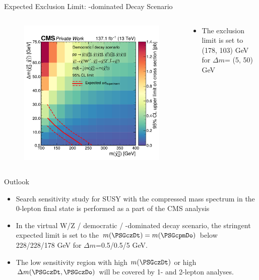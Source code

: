 \begin{frame}[fragile]{Expected Exclusion Limit: \PSGt-dominated Decay Scenario}
  \begin{columns}
    \begin{column}{0.5\textwidth}
      \begin{figure}[htpb]
        \centering
        \includegraphics[width=1.0\textwidth]{fig/exclusion-3d/Limit3D_democratic.pdf}
      \end{figure}

    \end{column}
    \begin{column}{0.5\textwidth}
      \begin{itemize}
        \item The exclusion limit is set to (178, 103) GeV for \(\Delta m\)= (5, 50) GeV
      \end{itemize}
    \end{column}
  \end{columns}
\end{frame}

\begin{frame}[fragile]{Outlook}
  \begin{itemize}
    \item Search sensitivity study for SUSY with the compressed mass spectrum in the 0-lepton final state is performed as a part of the CMS analysis 
    \item In the virtual W/Z / democratic \PSl / \PSGt-dominated decay scenario, the stringent expected limit is set to the \(m(\PSGczDt)=m(\PSGcpmDo)\) below 228/228/178 GeV for \(\Delta m\)=0.5/0.5/5 GeV.
    \item The low sensitivity region with high \(m(\PSGczDt)\) or high \(\Delta m(\PSGczDt, \PSGczDo)\) will be covered by 1- and 2-lepton analyses.
  \end{itemize}
\end{frame}
